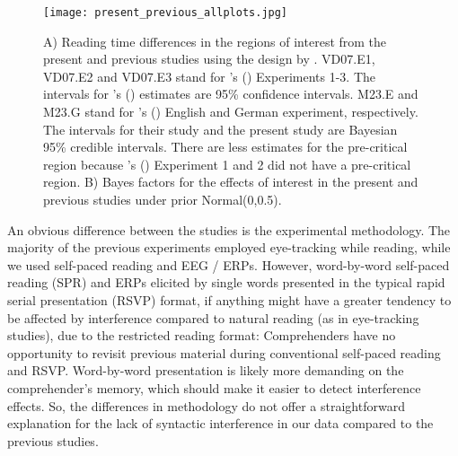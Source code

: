 \documentclass[review,preprint,12pt,authoryear,floatsintext]{elsarticle}
\begin{document}
{{\begin{figure}
    \caption{A) Reading time differences in the regions of interest from the present and previous studies using the design by \cite{vandyke07}. VD07.E1, VD07.E2 and VD07.E3 stand for \citeauthor{vandyke07}'s (\citeyear{vandyke07}) Experiments 1-3. The intervals for \citeauthor{vandyke07}'s (\citeyear{vandyke07}) estimates are 95\% confidence intervals. M23.E and M23.G stand for \citeauthor{mertzen}'s (\citeyear{mertzen}) English and German experiment, respectively. The intervals for their study and the present study are Bayesian 95\% credible intervals. There are less estimates for the pre-critical region because \citeauthor{vandyke07}'s (\citeyear{vandyke07}) Experiment 1 and 2 did not have a pre-critical region. B) Bayes factors for the effects of interest in the present and previous studies under prior Normal(0,0.5).}
    \label{fig:previous_vs_present}
    \centering
    \texttt{[image: present\_previous\_allplots.jpg]}
\end{figure}

An obvious difference between the studies is the experimental methodology. The majority of the previous experiments employed eye-tracking while reading, while we used self-paced reading and EEG / ERPs. However, word-by-word self-paced reading (SPR) and ERPs elicited by single words presented in the typical rapid serial presentation (RSVP) format, if anything might have a greater tendency to be affected by interference compared to natural reading (as in eye-tracking studies), due to the restricted reading format: Comprehenders have no opportunity to revisit previous material during conventional self-paced reading \citep[but see][]{BSPR} and RSVP. Word-by-word presentation is likely more demanding on the comprehender's memory, which should make it easier to detect interference effects. So, the differences in methodology do not offer a straightforward
explanation for the lack of syntactic interference in our data compared to the previous studies.  \label{SPR_goodenough}


}}
\end{document}
